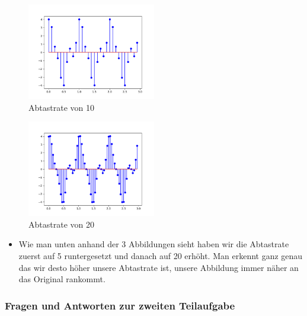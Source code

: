 \documentclass[a4paper, 11pt]{article}
\begin{document}
        \begin{figure}
            \centering
            \includegraphics[width =0.5\textwidth]{Abild221.png}
            \caption{Abtastrate von 10}
            \label{fig : label3}
            \end{figure}

            \begin{figure}
                \centering
                \includegraphics[width =0.5\textwidth]{Abild222.png}
                \caption{Abtastrate von 20}
                \label{fig : label4}
                \end{figure}
    
    
                    \begin{itemize}
                    \item Wie man unten anhand der 3 Abbildungen sieht haben wir die Abtastrate zuerst auf 5 runtergesetzt und danach auf 20 erhöht. 
                    Man erkennt ganz genau das wir desto höher unsere Abtastrate ist, unsere Abbildung immer näher an das Original rankommt.
                    \end{itemize}
    
    
   
    
    \subsubsection{Fragen und Antworten zur zweiten Teilaufgabe}
\end{document}
